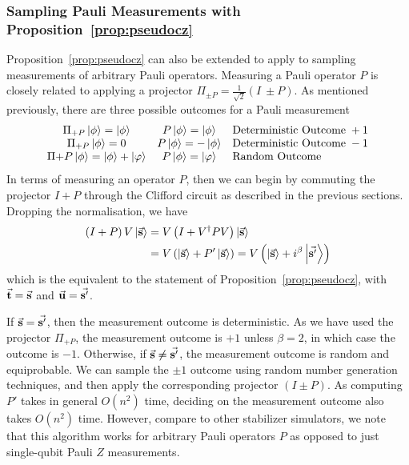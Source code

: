 \subsubsection*{Sampling Pauli Measurements with Proposition~\ref{prop:pseudocz}}
Proposition~\ref{prop:pseudocz} can also be extended to apply to sampling measurements of arbitrary Pauli operators. Measuring a Pauli operator $P$ is closely related to applying a projector $\Pi_{\pm P}=\frac{1}{\sqrt{2}}\left(I\ \pm P\right)$. As mentioned previously, there are three possible outcomes for a Pauli measurement
\[
\begin{array}{c c l}
\Pi_{+P}\ket{\phi} = \ket{\phi} & P\ket{\phi} = \ket{\phi} & \text{Deterministic Outcome}\;+1\\
\Pi_{+P}\ket{\phi} = 0 & P\ket{\phi} = -\ket{\phi} & \text{Deterministic Outcome}\; -1\\
\Pi{+P}\ket{\phi} = \ket{\phi}+\ket{\varphi} & P\ket{\phi}=\ket{\varphi} & \text{Random Outcome} \\
\end{array}
\]
In terms of measuring an operator $P$, then we can begin by commuting the projector $I+P$ through the Clifford circuit as described in the previous sections. Dropping the normalisation, we have
\begin{align*}
\left(I+P\right)V\ket{\va{s}} &= V\left(I+V^{\dagger}PV\right)\ket{\va{s}} \\
& = V\left(\ket{\va{s}}+P'\ket{\va{s}}\right) = V\left(\ket{\va{s}}+i^{\beta}\ket{\va{s'}}\right)
\end{align*}
which is the equivalent to the statement of Proposition~\ref{prop:pseudocz}, with $\va{t}=\va{s}$ and $\va{u}=\va{s'}$.\par
If $\va{s}=\va{s'}$, then the measurement outcome is deterministic. As we have used the projector $\Pi_{+P}$, the measurement outcome is $+1$ unless $\beta=2$, in which case the outcome is $-1$. Otherwise, if $\va{s}\neq \va{s'}$, the measurement outcome is random and equiprobable. We can sample the $\pm 1$ outcome using random number generation techniques, and then apply the corresponding projector $\left(I\pm P\right)$. As computing $P'$ takes in general $O(n^{2})$ time, deciding on the measurement outcome also takes $O(n^{2})$ time. However, compare to other stabilizer simulators, we note that this algorithm works for arbitrary Pauli operators $P$ as opposed to just single-qubit Pauli $Z$ measurements.
